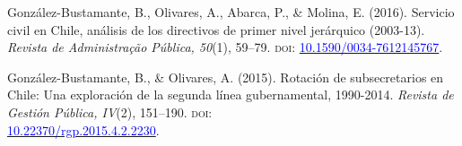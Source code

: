\begin{publications}
\begin{benumerate}{10}
\item{González-Bustamante, B., Olivares, A., Abarca, P., \& Molina, E. (2016). Servicio civil en Chile, análisis de los directivos de primer nivel jerárquico (2003-13). {\itshape Revista de Administra\c{c}\~ao Pública, 50}(1), 59--79. {\scshape doi}: \href{http://dx.doi.org/10.1590/0034-7612145767}{\textcolor{blue}{10.1590/0034-7612145767}}.} \vspace{1mm}


\item{González-Bustamante, B., \& Olivares, A. (2015). Rotación de subsecretarios en Chile: Una exploración de la segunda línea gubernamental, 1990-2014. {\itshape Revista de Gestión Pública, IV}(2), 151--190. {\scshape doi}: \\ \href{https://doi.org/10.22370/rgp.2015.4.2.2230}{\textcolor{blue}{10.22370/rgp.2015.4.2.2230}}.} \vspace{1mm}

\end{benumerate}

\end{publications}


